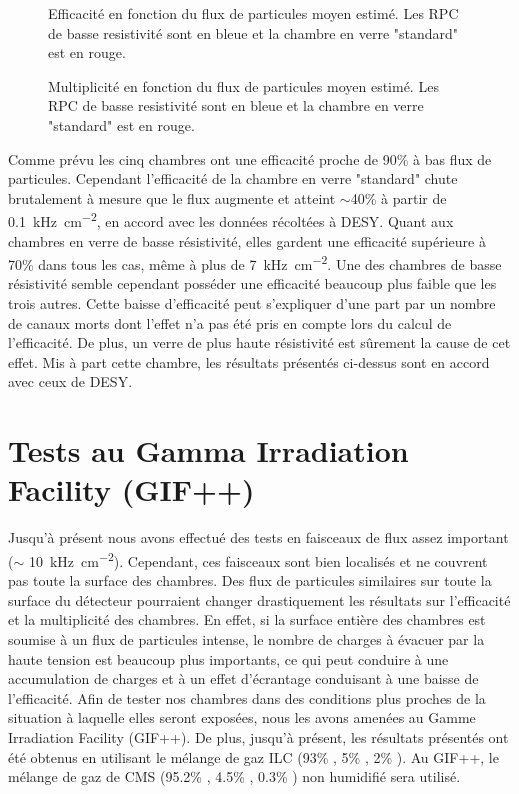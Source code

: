 \begin{figure}[!ht]
	\centering
	\scalebox{1.4}{}
	\caption{Efficacité en fonction du flux de particules moyen estimé. Les RPC de basse resistivité sont en bleue et la chambre en verre "standard" est en rouge.}
	\label{RateSPS}
\end{figure}

\begin{figure}[!ht]
	\centering
	\scalebox{1.6}{}
	\caption{Multiplicité en fonction du flux de particules moyen estimé. Les RPC de basse resistivité sont en bleue et la chambre en verre "standard" est en rouge.}
	\label{MultiplictySPS}
\end{figure}

Comme prévu les cinq chambres ont une efficacité proche de 90\% à bas flux de particules. Cependant l'efficacité de  la chambre en verre "standard" chute brutalement à mesure que le flux augmente et atteint $\sim $40\% à partir de \SI{0.1}{\kilo\hertz\per\square\centi\meter}, en accord avec les données récoltées à DESY. Quant aux chambres en verre de basse résistivité, elles gardent une efficacité supérieure à 70\% dans tous les cas, même à plus de \SI{7}{\kilo\hertz\per\square\centi\meter}. Une des chambres de basse résistivité semble cependant posséder une efficacité beaucoup plus faible que les trois autres. Cette baisse d'efficacité peut s'expliquer d'une part par un nombre de canaux morts dont l'effet n'a pas été pris en compte lors du calcul de l'efficacité. De plus, un verre de plus haute résistivité est sûrement la cause de cet effet. Mis à part cette chambre, les résultats présentés ci-dessus sont en accord avec ceux de DESY.

\section {Tests au Gamma Irradiation Facility (GIF++)}
Jusqu'à présent nous avons effectué des tests en faisceaux de flux assez important ($\sim$ \SI{10}{\kilo\hertz\per\square\centi\meter}). Cependant, ces faisceaux sont bien localisés et ne couvrent pas toute la surface des chambres. Des flux de particules similaires sur toute la surface du détecteur pourraient changer drastiquement les résultats sur l'efficacité et la multiplicité des chambres. En effet, si la surface entière des chambres est soumise à un flux de particules intense, le nombre de charges à évacuer par la haute tension est beaucoup plus importants, ce qui peut conduire à une accumulation de charges et à un effet d'écrantage conduisant à une baisse de l'efficacité. Afin de tester nos chambres dans des conditions plus proches de la situation à laquelle elles seront exposées, nous les avons amenées au Gamme Irradiation Facility (GIF++). De plus, jusqu'à présent, les résultats présentés ont été obtenus en utilisant le mélange de gaz ILC (93\% , 5\% , 2\% ). Au GIF++, le mélange de gaz de CMS (95.2\% , 4.5\% , 0.3\% ) non humidifié sera utilisé.

